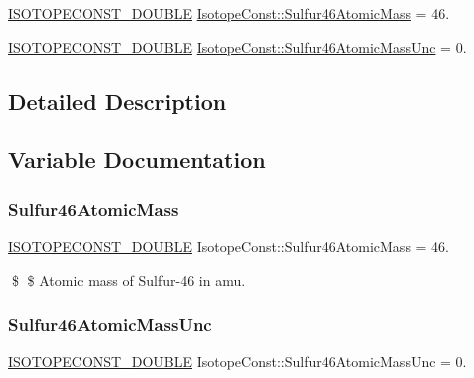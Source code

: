\begin{DoxyCompactItemize}
\item 
\mbox{\hyperlink{group___isotope_const-_macros_ga8f45a7272ce02c0b4c65c44636ed719a}{I\+S\+O\+T\+O\+P\+E\+C\+O\+N\+S\+T\+\_\+\+D\+O\+U\+B\+LE}} \mbox{\hyperlink{group___isotope_const-_sulfur-_s46_ga4d1af40b8094046866247d066370fa8a}{Isotope\+Const\+::\+Sulfur46\+Atomic\+Mass}} = 46.
\item 
\mbox{\hyperlink{group___isotope_const-_macros_ga8f45a7272ce02c0b4c65c44636ed719a}{I\+S\+O\+T\+O\+P\+E\+C\+O\+N\+S\+T\+\_\+\+D\+O\+U\+B\+LE}} \mbox{\hyperlink{group___isotope_const-_sulfur-_s46_ga68eb53dbac93d14f4d8a9bcd2a4a2a45}{Isotope\+Const\+::\+Sulfur46\+Atomic\+Mass\+Unc}} = 0.
\end{DoxyCompactItemize}


\subsection{Detailed Description}


\subsection{Variable Documentation}
\mbox{\label{group___isotope_const-_sulfur-_s46_ga4d1af40b8094046866247d066370fa8a}} 
\subsubsection{\texorpdfstring{Sulfur46\+Atomic\+Mass}{Sulfur46AtomicMass}}
{\footnotesize\ttfamily \mbox{\hyperlink{group___isotope_const-_macros_ga8f45a7272ce02c0b4c65c44636ed719a}{I\+S\+O\+T\+O\+P\+E\+C\+O\+N\+S\+T\+\_\+\+D\+O\+U\+B\+LE}} Isotope\+Const\+::\+Sulfur46\+Atomic\+Mass = 46.}

\$ \$ Atomic mass of Sulfur-\/46 in amu. \mbox{\label{group___isotope_const-_sulfur-_s46_ga68eb53dbac93d14f4d8a9bcd2a4a2a45}} 
\subsubsection{\texorpdfstring{Sulfur46\+Atomic\+Mass\+Unc}{Sulfur46AtomicMassUnc}}
{\footnotesize\ttfamily \mbox{\hyperlink{group___isotope_const-_macros_ga8f45a7272ce02c0b4c65c44636ed719a}{I\+S\+O\+T\+O\+P\+E\+C\+O\+N\+S\+T\+\_\+\+D\+O\+U\+B\+LE}} Isotope\+Const\+::\+Sulfur46\+Atomic\+Mass\+Unc = 0.}

